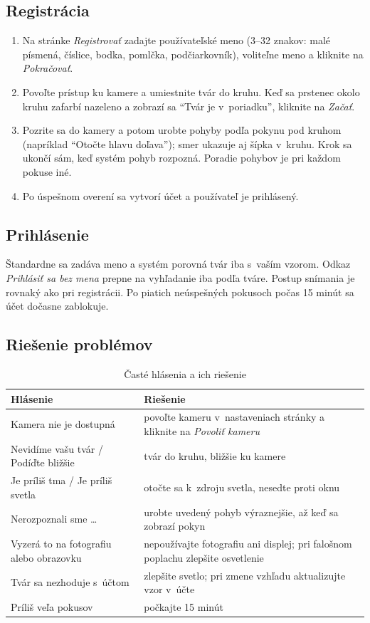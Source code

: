 \documentclass[12pt,a4paper,oneside]{report}
\begin{document}
\subsection*{Registrácia}
\begin{enumerate}
  \item Na stránke \emph{Registrovať} zadajte používateľské meno (3--32 znakov: malé
        písmená, číslice, bodka, pomlčka, podčiarkovník), voliteľne meno a kliknite na
        \emph{Pokračovať}.
  \item Povoľte prístup ku kamere a umiestnite tvár do kruhu. Keď sa prstenec okolo kruhu
        zafarbí nazeleno a zobrazí sa \enquote{Tvár je v~poriadku}, kliknite na
        \emph{Začať}.
  \item Pozrite sa do kamery a potom urobte pohyby podľa pokynu pod kruhom (napríklad
        \enquote{Otočte hlavu doľava}); smer ukazuje aj šípka v~kruhu. Krok sa ukončí
        sám, keď systém pohyb rozpozná. Poradie pohybov je pri každom pokuse iné.
  \item Po úspešnom overení sa vytvorí účet a používateľ je prihlásený.
\end{enumerate}

\subsection*{Prihlásenie}
Štandardne sa zadáva meno a systém porovná tvár iba s~vaším vzorom. Odkaz
\emph{Prihlásiť sa bez mena} prepne na vyhľadanie iba podľa tváre. Postup snímania je
rovnaký ako pri registrácii. Po piatich neúspešných pokusoch počas 15 minút sa účet
dočasne zablokuje.

\subsection*{Riešenie problémov}
\begin{table}[H]
  \centering
  \caption{Časté hlásenia a ich riešenie}
  \label{tab:hlasenia}
  \small
  \begin{tabularx}{\textwidth}{@{}>{\raggedright\arraybackslash}p{5.5cm} X@{}}
    \toprule
    Hlásenie & Riešenie \\
    \midrule
    Kamera nie je dostupná & povoľte kameru v~nastaveniach stránky a kliknite na \emph{Povoliť kameru} \\
    Nevidíme vašu tvár / Podíďte bližšie & tvár do kruhu, bližšie ku kamere \\
    Je príliš tma / Je príliš svetla & otočte sa k~zdroju svetla, nesedte proti oknu \\
    Nerozpoznali sme \ldots{} & urobte uvedený pohyb výraznejšie, až keď sa zobrazí pokyn \\
    Vyzerá to na fotografiu alebo obrazovku & nepoužívajte fotografiu ani displej; pri falošnom poplachu zlepšite osvetlenie \\
    Tvár sa nezhoduje s~účtom & zlepšite svetlo; pri zmene vzhľadu aktualizujte vzor v~účte \\
    Príliš veľa pokusov & počkajte 15 minút \\
    \bottomrule
  \end{tabularx}
\end{table}
\end{document}
